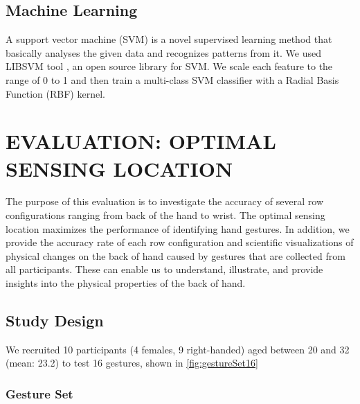 \documentclass{sigchi}
\begin{document}
\subsection{Machine Learning}
A support vector machine (SVM) is a novel supervised learning method that basically analyses the given data and recognizes patterns from it.
We used LIBSVM tool \cite{CC01a}, an open source library for SVM. 
We scale each feature to the range of 0 to 1 and then train a multi-class SVM classifier with a Radial Basis Function (RBF) kernel.

\section{EVALUATION: OPTIMAL SENSING LOCATION}

The purpose of this evaluation is to investigate the accuracy of several row configurations ranging from back of the hand to wrist. 
The optimal sensing location maximizes the performance of identifying hand gestures.
In addition, we provide the accuracy rate of each row configuration and scientific visualizations of physical changes on the back of hand caused by gestures that are collected from all participants. These can enable us to understand, illustrate, and provide insights into the physical properties of the back of hand. %

\subsection{Study Design}
We recruited 10 participants (4 females, 9 right-handed) aged between 20 and 32 (mean: 23.2) to test 16 gestures, shown in \autoref{fig:gestureSet16}

\subsubsection{Gesture Set}

\end{document}
